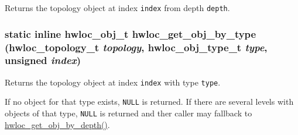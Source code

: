 Returns the topology object at index {\tt index} from depth {\tt depth}. 

\hypertarget{group__hwlocality__traversal_g0ed52dae74f311185210e7a19dbf44c5}{
\subsubsection[{hwloc\_\-get\_\-obj\_\-by\_\-type}]{\setlength{\rightskip}{0pt plus 5cm}static inline {\bf hwloc\_\-obj\_\-t} hwloc\_\-get\_\-obj\_\-by\_\-type ({\bf hwloc\_\-topology\_\-t} {\em topology}, \/  {\bf hwloc\_\-obj\_\-type\_\-t} {\em type}, \/  unsigned {\em index})}}
\label{group__hwlocality__traversal_g0ed52dae74f311185210e7a19dbf44c5}


Returns the topology object at index {\tt index} with type {\tt type}. 

If no object for that type exists, {\tt NULL} is returned. If there are several levels with objects of that type, {\tt NULL} is returned and ther caller may fallback to \hyperlink{group__hwlocality__traversal_g75e8ae1463be35a0fb82f2f7f73b8170}{hwloc\_\-get\_\-obj\_\-by\_\-depth()}. 

